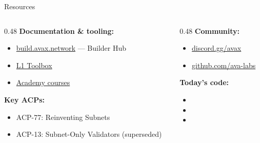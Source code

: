 \documentclass[aspectratio=169]{beamer}
\begin{document}
\begin{frame}{Resources}
	\begin{columns}[t]
		\begin{column}{0.48\textwidth}
			\textbf{Documentation \& tooling:}
			\begin{itemize}
				\item \href{https://build.avax.network}{build.avax.network} — Builder Hub
				\item \href{https://build.avax.network/tools/l1-toolbox}{L1 Toolbox}
				\item \href{https://build.avax.network/academy}{Academy courses}
			\end{itemize}

			\vspace{0.5em}
			\textbf{Key ACPs:}
			\begin{itemize}
				\item ACP-77: Reinventing Subnets
				\item ACP-13: Subnet-Only Validators (superseded)
			\end{itemize}
		\end{column}
		\begin{column}{0.48\textwidth}
			\textbf{Community:}
			\begin{itemize}
				\item \href{https://discord.gg/avax}{discord.gg/avax}
				\item \href{https://github.com/ava-labs}{github.com/ava-labs}
			\end{itemize}

			\vspace{0.5em}
			\textbf{Today's code:}
			\begin{itemize}
				\item {}
				\item {}
				\item {}
			\end{itemize}
		\end{column}
	\end{columns}
\end{frame}
\end{document}

